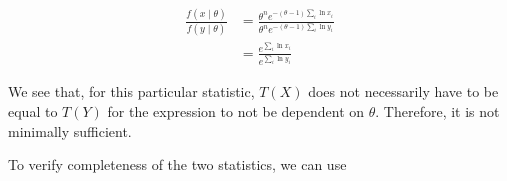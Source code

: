 \documentclass[11pt]{article}
\begin{document}
\begin{align*}
  \frac{f(x \mid \theta)}{f(y \mid \theta)} &= \frac{\theta^n
                                              e^{-(\theta-1)\sum_i
                                              \ln{x_i}}}{\theta^n
                                              e^{-(\theta-1) \sum_i
                                              \ln{y_i}}} \\
                                            &= \frac{e^{\sum_i
                                              \ln{x_i}}}{e^{\sum_i
                                              \ln{y_i}}}
\end{align*}

We see that, for this particular statistic, $T(X)$ does not
necessarily have to be equal to $T(Y)$ for the expression to not be
dependent on $\theta$.  Therefore, it is not minimally sufficient.

To verify completeness of the two statistics, we can use 
\end{document}
